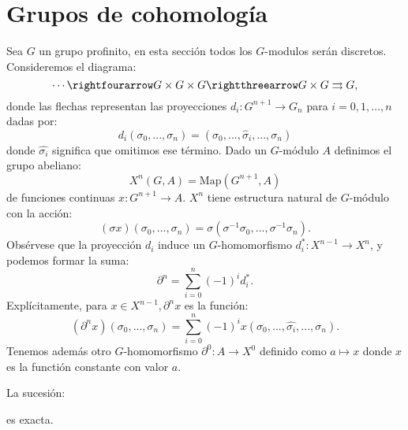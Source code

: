 \documentclass[a4paper,12pt, leqno]{report}
\begin{document}
\section*{Grupos de cohomología}
Sea $G$ un grupo profinito, en esta sección todos los $G$-modulos serán discretos. Consideremos el diagrama:
\begin{equation*}
	\cdots \rightfourarrow G \times G \times G \rightthreearrow G \times G \rightrightarrows G,
\end{equation*}
donde las flechas representan las proyecciones $d_i:G^{n+1}\rightarrow G_n$ para $i=0,1,...,n$ dadas por:
\begin{equation*}
d_i(\sigma_0,...,\sigma_n)=(\sigma_0,...,\hat{\sigma}_i,...,\sigma_n)
\end{equation*}
donde $\hat{\sigma_i}$ significa que omitimos ese término. Dado un $G$-módulo $A$ definimos el grupo abeliano:
\begin{equation*}
X^n(G,A)=\mathrm{Map}(G^{n+1},A)
\end{equation*}
de funciones continuas $x: G^{n+1}\rightarrow A$. $X^n$ tiene estructura natural de $G$-módulo con la acción:
\begin{equation*}
(\sigma x)(\sigma_0,...,\sigma_n)=\sigma(\sigma^{-1}\sigma_0,...,\sigma^{-1}\sigma_n).
\end{equation*}
Obsérvese que la proyección $d_i$ induce un $G$-homomorfismo $d_i^*:X^{n-1}\rightarrow X^n$, y podemos formar la suma:
\begin{equation*}
\partial^n=\sum_{i=0}^{n}(-1)^i d_i^*.
\end{equation*}
Explícitamente, para $x \in X^{n-1}, \partial^n x$ es la función:
\begin{equation*}
(\partial^n x)(\sigma_0,...,\sigma_n)=\sum_{i=0}^{n}(-1)^i x(\sigma_0,...,\hat{\sigma_i},...,\sigma_n).
\end{equation*}
Tenemos además otro $G$-homomorfismo $\partial^0: A \rightarrow X^0$ definido como $a \mapsto x$ donde $x$ es la functión constante con valor $a$.
\begin{prop}
	La sucesión:
\begin{center}
\end{center}
es exacta.
\end{prop}
\end{document}
